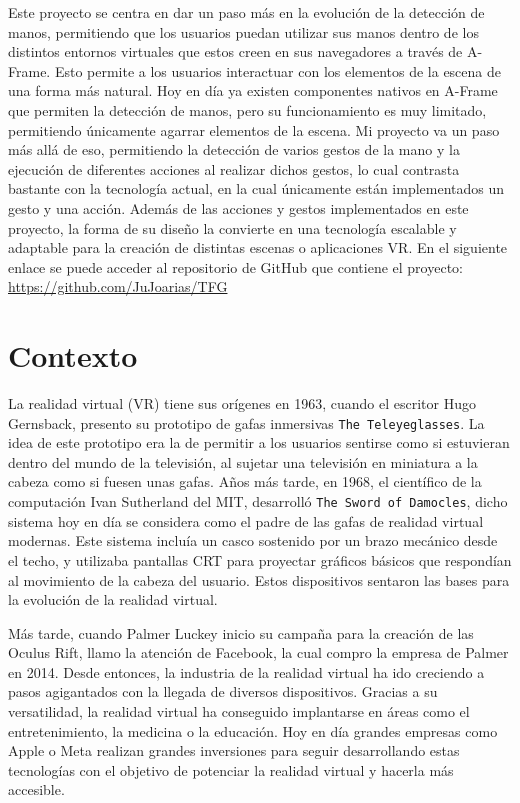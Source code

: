 \documentclass[a4paper, 12pt]{book}
\begin{document}
Este proyecto se centra en dar un paso más en la evolución de la detección de manos, permitiendo que los usuarios puedan utilizar sus manos dentro de los distintos entornos virtuales que estos creen en sus navegadores a través de A-Frame. 
Esto permite a los usuarios interactuar con los elementos de la escena de una forma más natural. Hoy en día ya existen componentes nativos en A-Frame que permiten la detección de manos, pero su funcionamiento es muy limitado, permitiendo únicamente agarrar elementos de la escena.
Mi proyecto va un paso más allá de eso, permitiendo la detección de varios gestos de la mano y la ejecución de diferentes acciones al realizar dichos gestos, lo cual contrasta bastante con la tecnología actual, en la cual únicamente están implementados un gesto y una acción.
Además de las acciones y gestos implementados en este proyecto, la forma de su diseño la convierte en una tecnología escalable y adaptable para la creación de distintas escenas o aplicaciones VR. En el siguiente enlace se puede acceder al repositorio de GitHub que contiene el proyecto: \url{https://github.com/JuJoarias/TFG}

\section{Contexto}
\label{sec:contexto}
La realidad virtual (VR) tiene sus orígenes en 1963, cuando el escritor Hugo Gernsback, presento su prototipo de gafas inmersivas \texttt{The Teleyeglasses}. La idea de este prototipo era la de permitir a los usuarios sentirse como si estuvieran dentro del mundo de la televisión, al sujetar una televisión en miniatura a la cabeza como si fuesen unas gafas. Años más tarde, en 1968, el científico de la computación Ivan Sutherland del MIT,
desarrolló \texttt{The Sword of Damocles}, dicho sistema hoy en día se considera como el padre de las gafas de realidad virtual modernas. Este sistema incluía un casco sostenido por un brazo mecánico desde el techo, y utilizaba pantallas CRT para proyectar gráficos básicos que respondían al movimiento de la cabeza del usuario.
Estos dispositivos sentaron las bases para la evolución de la realidad virtual. 

Más tarde, cuando Palmer Luckey inicio su campaña para la creación de las Oculus Rift, llamo la atención de Facebook, la cual compro la empresa de Palmer en 2014. Desde entonces, la industria de la realidad virtual ha ido creciendo a pasos agigantados con la llegada de diversos dispositivos. Gracias a su versatilidad, la realidad virtual ha conseguido implantarse en áreas como el entretenimiento, la medicina o la educación. Hoy en día grandes empresas como Apple o Meta 
realizan grandes inversiones para seguir desarrollando estas tecnologías con el objetivo de potenciar la realidad virtual y hacerla más accesible.  
\end{document}
